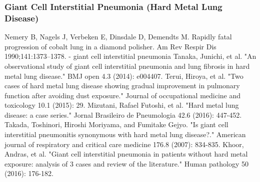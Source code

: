 \documentclass[a4
er,12pt]{article}
\begin{document}
\subsubsection{Giant Cell Interstitial Pneumonia (Hard Metal Lung Disease)}
Nemery B, Nagels J, Verbeken E, Dinsdale D, Demendts M. Rapidly
fatal progression of cobalt lung in a diamond polisher. Am Rev Respir
Dis 1990;141:1373–1378. - giant cell interstitial pneumonia
Tanaka, Junichi, et al. "An observational study of giant cell interstitial pneumonia and lung fibrosis in hard metal lung disease." BMJ open 4.3 (2014): e004407.
Terui, Hiroya, et al. "Two cases of hard metal lung disease showing gradual improvement in pulmonary function after avoiding dust exposure." Journal of occupational medicine and toxicology 10.1 (2015): 29.
Mizutani, Rafael Futoshi, et al. "Hard metal lung disease: a case series." Jornal Brasileiro de Pneumologia 42.6 (2016): 447-452.
Takada, Toshinori, Hiroshi Moriyama, and Fumitake Gejyo. "Is giant cell interstitial pneumonitis synonymous with hard metal lung disease?." American journal of respiratory and critical care medicine 176.8 (2007): 834-835.
Khoor, Andras, et al. "Giant cell interstitial pneumonia in patients without hard metal exposure: analysis of 3 cases and review of the literature." Human pathology 50 (2016): 176-182.




%
\end{document}
